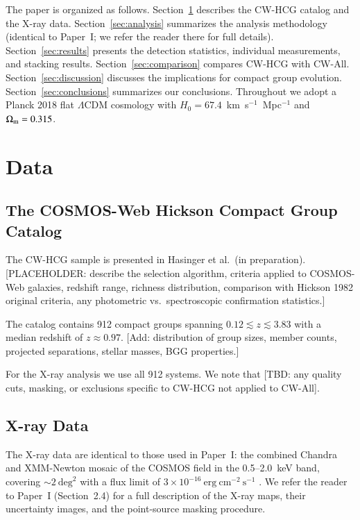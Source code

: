\documentclass{aa}
\begin{document}
The paper is organized as follows. Section~\ref{sec:data} describes the CW-HCG catalog and the X-ray data. Section~\ref{sec:analysis} summarizes the analysis methodology (identical to Paper~I; we refer the reader there for full details). Section~\ref{sec:results} presents the detection statistics, individual measurements, and stacking results. Section~\ref{sec:comparison} compares CW-HCG with CW-All. Section~\ref{sec:discussion} discusses the implications for compact group evolution. Section~\ref{sec:conclusions} summarizes our conclusions. Throughout we adopt a Planck 2018 flat $\Lambda$CDM cosmology \citep{Aghanim2020} with $H_0 = 67.4$~km~s$^{-1}$~Mpc$^{-1}$ and $\Omega_{\rm m} = 0.315$.

\section{Data}
\label{sec:data}

\subsection{The COSMOS-Web Hickson Compact Group Catalog}

The CW-HCG sample is presented in Hasinger et al.\ (in preparation). [PLACEHOLDER: describe the selection algorithm, criteria applied to COSMOS-Web galaxies, redshift range, richness distribution, comparison with Hickson 1982 original criteria, any photometric vs.\ spectroscopic confirmation statistics.]

The catalog contains 912 compact groups spanning $0.12 \lesssim z \lesssim 3.83$ with a median redshift of $z \approx 0.97$. [Add: distribution of group sizes, member counts, projected separations, stellar masses, BGG properties.]

For the X-ray analysis we use all 912 systems. We note that [TBD: any quality cuts, masking, or exclusions specific to CW-HCG not applied to CW-All].

\subsection{X-ray Data}

The X-ray data are identical to those used in Paper~I: the combined Chandra and XMM-Newton mosaic of the COSMOS field in the 0.5--2.0~keV band, covering $\sim 2~\mathrm{deg}^2$ with a flux limit of $3 \times 10^{-16}~\mathrm{erg~cm^{-2}~s^{-1}}$ \citep{Gozaliasl2019}. We refer the reader to Paper~I (Section~2.4) for a full description of the X-ray maps, their uncertainty images, and the point-source masking procedure.
\end{document}
